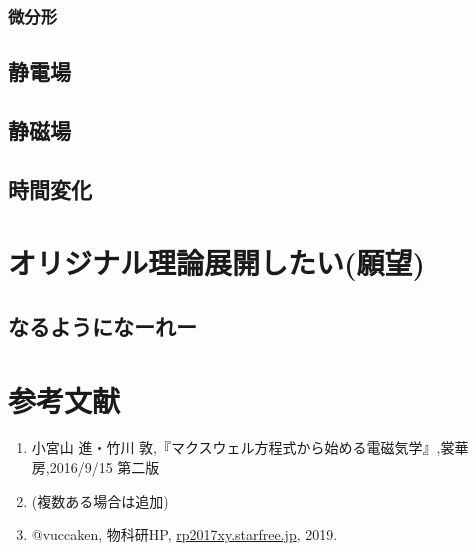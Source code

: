 \documentclass[10pt,b5paper,papersize,dvipdfmx]{jsbook}
\begin{document}
\subsubsection{微分形}

\subsection{静電場}
\subsection{静磁場}
\subsection{時間変化}
\subsection{}

\section{オリジナル理論展開したい(願望)}
\subsection{なるようになーれー}

\section{参考文献}
\renewcommand{\labelenumi}{[\arabic{enumi}]} %
\begin{enumerate}
\item 小宮山 進・竹川 敦,『マクスウェル方程式から始める電磁気学』,裳華房,2016/9/15 第二版
\item (複数ある場合は追加)
\item @vuccaken, 物科研HP, \url{rp2017xy.starfree.jp}, 2019.
\end{enumerate}
\renewcommand{\labelenumi}{\arabic{enumi}.} %
\end{document}
